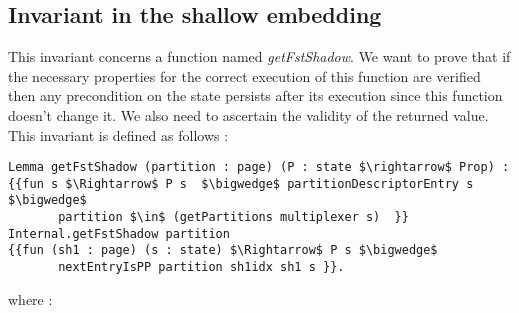 \subsection{Invariant in the shallow embedding} \label{getFstInv}
This invariant concerns a function named \textit{getFstShadow}. We want to prove that if the necessary properties for the correct execution of this function are verified then any precondition on the state persists after its execution since this function doesn't change it. We also need to ascertain the validity of the returned value. This invariant is defined as follows :  
\begin{lstlisting}[caption = {getFstShadow invariant in the shallow embedding}, xleftmargin=-.02\textwidth,
xrightmargin=-.02\textwidth,mathescape=true]
Lemma getFstShadow (partition : page) (P : state $\rightarrow$ Prop) :
{{fun s $\Rightarrow$ P s  $\bigwedge$ partitionDescriptorEntry s $\bigwedge$ 
	   partition $\in$ (getPartitions multiplexer s)  }} 
Internal.getFstShadow partition
{{fun (sh1 : page) (s : state) $\Rightarrow$ P s $\bigwedge$ 
	   nextEntryIsPP partition sh1idx sh1 s }}.
\end{lstlisting}
where :
